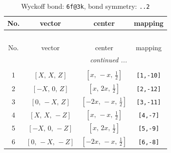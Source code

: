 \documentclass[fleqn,8pt]{jsarticle}
\begin{document}
\begin{longtable}{cccc}
\caption{Wyckoff bond: {\tt 6f@3k}, bond symmetry: {\tt ..2}}
 \\
 \hline \hline
No. & vector & center & mapping \\ \hline \endfirsthead

\multicolumn{3}{l}{\tablename\ \thetable{}} \\
 \hline \hline
No. & vector & center & mapping \\ \hline \endhead

 \hline \hline
\multicolumn{3}{r}{\footnotesize\it continued ...} \\ \endfoot

 \hline \hline
\multicolumn{3}{r}{} \\ \endlastfoot

1 & $\left[ X,\, X,\, Z \right]$ & $\left[ x,\, - x,\, \frac{1}{2} \right]$ & {\tt [1,-10]} \\ \hline
2 & $\left[ - X,\, 0,\, Z \right]$ & $\left[ x,\, 2 x,\, \frac{1}{2} \right]$ & {\tt [2,-12]} \\ \hline
3 & $\left[ 0,\, - X,\, Z \right]$ & $\left[ - 2 x,\, - x,\, \frac{1}{2} \right]$ & {\tt [3,-11]} \\ \hline
4 & $\left[ X,\, X,\, - Z \right]$ & $\left[ x,\, - x,\, \frac{1}{2} \right]$ & {\tt [4,-7]} \\ \hline
5 & $\left[ - X,\, 0,\, - Z \right]$ & $\left[ x,\, 2 x,\, \frac{1}{2} \right]$ & {\tt [5,-9]} \\ \hline
6 & $\left[ 0,\, - X,\, - Z \right]$ & $\left[ - 2 x,\, - x,\, \frac{1}{2} \right]$ & {\tt [6,-8]} \\
\end{longtable}
\renewcommand{\arraystretch}{1.2}
\end{document}
